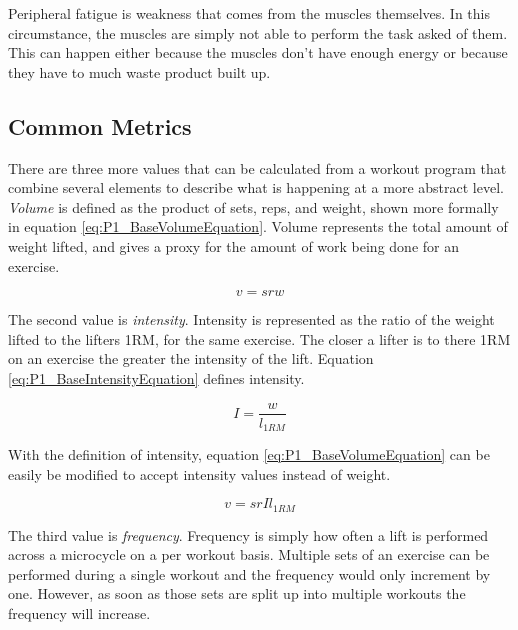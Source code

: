 Peripheral fatigue is weakness that comes from the muscles themselves. In this circumstance, the muscles are simply not able to perform the task asked of them. This can happen either because the muscles don't have enough energy or because they have to much waste product built up. \cite{MEASURING_FATIGUE}

\subsection{Common Metrics}
\label{sec:P1_CommonMetrics}

There are three more values that can be calculated from a workout program that combine several elements to describe what is happening at a more abstract level. \textit{Volume} is defined as the product of sets, reps, and weight, shown more formally in equation \ref{eq:P1_BaseVolumeEquation}. Volume represents the total amount of weight lifted, and gives a proxy for the amount of work being done for an exercise.

\begin{equation}
    \label{eq:P1_BaseVolumeEquation}
    v=srw
\end{equation}

The second value is \textit{intensity}. Intensity is represented as the ratio of the weight lifted to the lifters 1RM, for the same exercise. The closer a lifter is to there 1RM on an exercise the greater the intensity of the lift. Equation \ref{eq:P1_BaseIntensityEquation} defines intensity.

\begin{equation}
    \label{eq:P1_BaseIntensityEquation}
    I=\frac{w}{l_{1RM}}
\end{equation}

With the definition of intensity, equation \ref{eq:P1_BaseVolumeEquation} can be easily be modified to accept intensity values instead of weight.

\begin{equation}
    \label{eq:P1_IntensityBasedVolumeEquation}
    v=srIl_{1RM}
\end{equation}

The third value is \textit{frequency}. Frequency is simply how often a lift is performed across a microcycle on a per workout basis. Multiple sets of an exercise can be performed during a single workout and the frequency would only increment by one. However, as soon as those sets are split up into multiple workouts the frequency will increase. 


